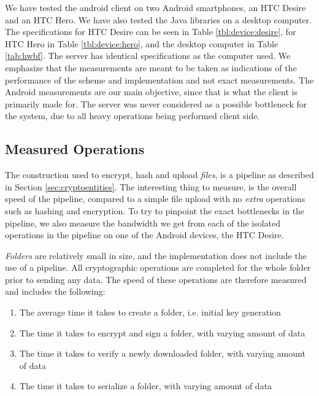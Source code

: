 \documentclass[pdftex,english,10pt,b5paper,twoside]{book}
\begin{document}
We have tested the android client on two Android smartphones, an HTC Desire and
an HTC Hero. We have also tested the Java libraries on a desktop computer. The
specifications for HTC Desire can be seen in Table \ref{tbl:device:desire}, for
HTC Hero in Table \ref{tbl:device:hero}, and the desktop computer in Table
\ref{tab:hwbf}. The server has identical specifications as the
computer used. We emphasize that the measurements are meant to be taken as
indications of the performance of the scheme and implementation and not exact
measurements. The Android measurements are our main objective, since that is
what the client is primarily made for. The server was never considered as a
possible bottleneck for the system, due to all heavy operations being performed
client side.





\subsection{Measured Operations}

The construction used to encrypt, hash and upload \emph{files}, is a pipeline
as described in Section \ref{sec:cryptoentities}. The interesting thing to
measure, is the overall speed of the pipeline, compared to a simple file upload
with no \emph{extra} operations such as hashing and encryption. To try to
pinpoint the exact bottlenecks in the pipeline, we also measure the bandwidth
we get from each of the isolated operations in the pipeline on one of the
Android devices, the HTC Desire.

\emph{Folders} are relatively small in size, and the implementation does not
include the use of a pipeline. All cryptographic operations are completed for
the whole folder prior to sending any data. The speed of these operations are
therefore measured and includes the following:

\begin{enumerate}
    \item The average time it takes to create a folder, i.e. initial key
        generation
    \item The time it takes to encrypt and sign a folder, with varying amount
        of data
    \item The time it takes to verify a newly downloaded folder, with varying
        amount of data
    \item The time it takes to serialize a folder, with varying amount of data
\end{enumerate}
\end{document}
